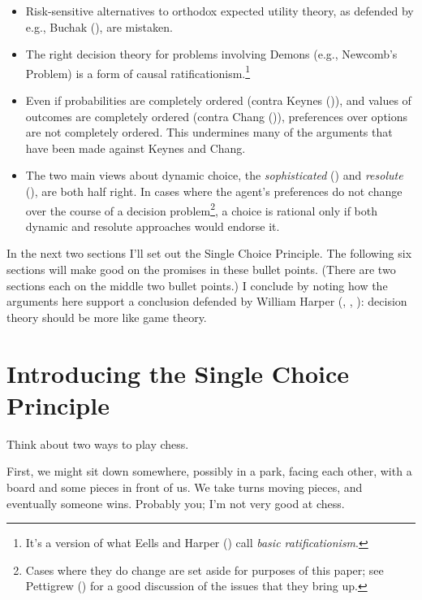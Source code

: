 \documentclass[
  10pt,
  letterpaper,
  DIV=11,
  numbers=noendperiod,
  twoside]{scrartcl}
\providecommand{\tightlist}{%
  \setlength{\itemsep}{0pt}\setlength{\parskip}{0pt}}\usepackage{longtable,booktabs,array}
\begin{document}
\begin{itemize}
\tightlist
\item
  Risk-sensitive alternatives to orthodox expected utility theory, as
  defended by e.g., Buchak (), are
  mistaken.
\item
  The right decision theory for problems involving Demons (e.g.,
  Newcomb's Problem) is a form of causal ratificationism.\footnote{It's
    a version of what Eells and Harper
    () call \emph{basic
    ratificationism}.}
\item
  Even if probabilities are completely ordered (contra Keynes
  ()), and values of outcomes are
  completely ordered (contra Chang ()),
  preferences over options are not completely ordered. This undermines
  many of the arguments that have been made against Keynes and Chang.
\item
  The two main views about dynamic choice, the \emph{sophisticated}
  () and \emph{resolute}
  (), are both half right.
  In cases where the agent's preferences do not change over the course
  of a decision problem\footnote{Cases where they do change are set
    aside for purposes of this paper; see Pettigrew
    () for a good discussion of the
    issues that they bring up.}, a choice is rational only if both
  dynamic and resolute approaches would endorse it.
\end{itemize}

In the next two sections I'll set out the Single Choice Principle. The
following six sections will make good on the promises in these bullet
points. (There are two sections each on the middle two bullet points.) I
conclude by noting how the arguments here support a conclusion defended
by William Harper (,
, ):
decision theory should be more like game theory.

\section{Introducing the Single Choice Principle}\label{sec-scp-intro}

Think about two ways to play chess.

First, we might sit down somewhere, possibly in a park, facing each
other, with a board and some pieces in front of us. We take turns moving
pieces, and eventually someone wins. Probably you; I'm not very good at
chess.
\end{document}
